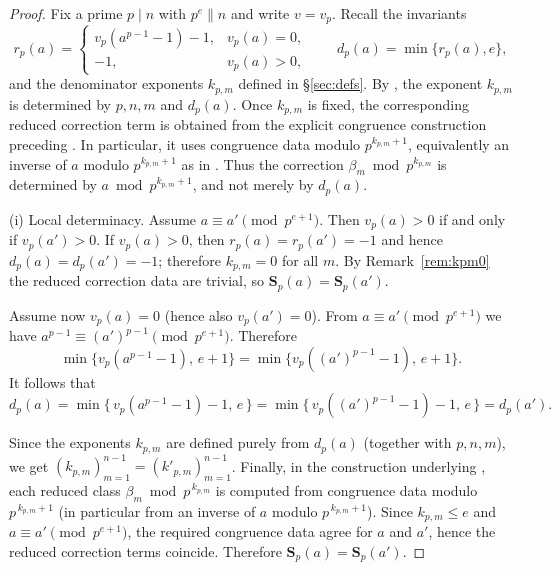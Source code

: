 \documentclass[12pt,a4paper,oneside]{amsart}
\theoremstyle{definition}
\begin{document}
\begin{proof}
Fix a prime $p\mid n$ with $p^{e}\parallel n$ and write $v=v_p$.
Recall the invariants
\[
r_p(a)=
\begin{cases}
v_p(a^{p-1}-1)-1,& v_p(a)=0,\\
-1,& v_p(a)>0,
\end{cases}
\qquad
d_p(a)=\min\{r_p(a),e\},
\]
and the denominator exponents $k_{p,m}$ defined in \S\ref{sec:defs}.
By \cite[Theorem~1.6]{JKS21}, the exponent \(k_{p,m}\) is determined by
\(p,n,m\) and \(d_p(a)\).  Once \(k_{p,m}\) is fixed, the corresponding
reduced correction term is obtained from the explicit congruence construction
preceding \cite[Theorem~1.6]{JKS21}. In particular, it uses congruence data
modulo \(p^{k_{p,m}+1}\), equivalently an inverse of \(a\) modulo
\(p^{k_{p,m}+1}\) as in \cite[Remark~1.7]{JKS21}.  Thus the correction
\(\beta_m\bmod p^{k_{p,m}}\) is determined by \(a\bmod p^{k_{p,m}+1}\), and
not merely by \(d_p(a)\).

\smallskip
\noindent\textup{(i) Local determinacy.}
Assume $a\equiv a'\pmod{p^{e+1}}$.
Then $v_p(a)>0$ if and only if $v_p(a')>0$.
If $v_p(a)>0$, then $r_p(a)=r_p(a')=-1$ and hence $d_p(a)=d_p(a')=-1$; therefore $k_{p,m}=0$ for all $m$.
By Remark~\ref{rem:kpm0} the reduced correction data are trivial, so $\mathbf S_p(a)=\mathbf S_p(a')$.

Assume now $v_p(a)=0$ (hence also $v_p(a')=0$). From $a\equiv a'\pmod{p^{e+1}}$ we have $a^{p-1}\equiv (a')^{p-1}\pmod{p^{e+1}}$. Therefore
\[
\min\bigl\{v_p(a^{p-1}-1),\,e+1\bigr\}
=
\min\bigl\{v_p((a')^{p-1}-1),\,e+1\bigr\}.
\]
It follows that
\[
d_p(a)=\min\{\,v_p(a^{p-1}-1)-1,\,e\,\}= \min\{\,v_p((a')^{p-1}-1)-1,\,e\,\}=d_p(a').
\]

Since the exponents $k_{p,m}$ are defined purely from $d_p(a)$ (together with $p,n,m$), we get $(k_{p,m})_{m=1}^{n-1}=(k'_{p,m})_{m=1}^{n-1}$.
Finally, in the construction underlying \cite[Theorem~1.6]{JKS21}, each reduced class
$\beta_m \bmod p^{\,k_{p,m}}$ is computed from congruence data modulo $p^{\,k_{p,m}+1}$
(in particular from an inverse of $a$ modulo $p^{\,k_{p,m}+1}$). Since $k_{p,m}\le e$ and
$a\equiv a'\pmod{p^{e+1}}$, the required congruence data agree for $a$ and $a'$, hence the
reduced correction terms coincide. Therefore $\mathbf S_p(a)=\mathbf S_p(a')$.



\end{proof}
\end{document}
